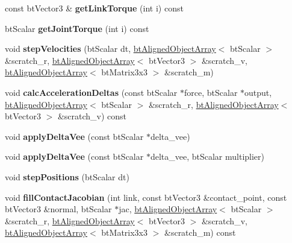 \begin{DoxyCompactItemize}
const bt\+Vector3 \& {\bfseries get\+Link\+Torque} (int i) const
\item 
\mbox{\label{classbtMultiBody_a9593430d6a1286f79cc7394c4aad98bf}} 
bt\+Scalar {\bfseries get\+Joint\+Torque} (int i) const
\item 
\mbox{\label{classbtMultiBody_a19f334bbde8909b282cd55bc28d75b4b}} 
void {\bfseries step\+Velocities} (bt\+Scalar dt, \hyperlink{classbtAlignedObjectArray}{bt\+Aligned\+Object\+Array}$<$ bt\+Scalar $>$ \&scratch\+\_\+r, \hyperlink{classbtAlignedObjectArray}{bt\+Aligned\+Object\+Array}$<$ bt\+Vector3 $>$ \&scratch\+\_\+v, \hyperlink{classbtAlignedObjectArray}{bt\+Aligned\+Object\+Array}$<$ bt\+Matrix3x3 $>$ \&scratch\+\_\+m)
\item 
\mbox{\label{classbtMultiBody_acdd6b296f59bcd747c614a58c616bdf0}} 
void {\bfseries calc\+Acceleration\+Deltas} (const bt\+Scalar $\ast$force, bt\+Scalar $\ast$output, \hyperlink{classbtAlignedObjectArray}{bt\+Aligned\+Object\+Array}$<$ bt\+Scalar $>$ \&scratch\+\_\+r, \hyperlink{classbtAlignedObjectArray}{bt\+Aligned\+Object\+Array}$<$ bt\+Vector3 $>$ \&scratch\+\_\+v) const
\item 
\mbox{\label{classbtMultiBody_ad233408cb61f257b1c3977bf3b7bcd8e}} 
void {\bfseries apply\+Delta\+Vee} (const bt\+Scalar $\ast$delta\+\_\+vee)
\item 
\mbox{\label{classbtMultiBody_aac7bf81725ac6ca493b03d264d06e663}} 
void {\bfseries apply\+Delta\+Vee} (const bt\+Scalar $\ast$delta\+\_\+vee, bt\+Scalar multiplier)
\item 
\mbox{\label{classbtMultiBody_a81d5daf2fe75d4f21149f2607002fe23}} 
void {\bfseries step\+Positions} (bt\+Scalar dt)
\item 
\mbox{\label{classbtMultiBody_aab4d830259cb82acba18ef5f46c7ea81}} 
void {\bfseries fill\+Contact\+Jacobian} (int link, const bt\+Vector3 \&contact\+\_\+point, const bt\+Vector3 \&normal, bt\+Scalar $\ast$jac, \hyperlink{classbtAlignedObjectArray}{bt\+Aligned\+Object\+Array}$<$ bt\+Scalar $>$ \&scratch\+\_\+r, \hyperlink{classbtAlignedObjectArray}{bt\+Aligned\+Object\+Array}$<$ bt\+Vector3 $>$ \&scratch\+\_\+v, \hyperlink{classbtAlignedObjectArray}{bt\+Aligned\+Object\+Array}$<$ bt\+Matrix3x3 $>$ \&scratch\+\_\+m) const

\end{DoxyCompactItemize}
